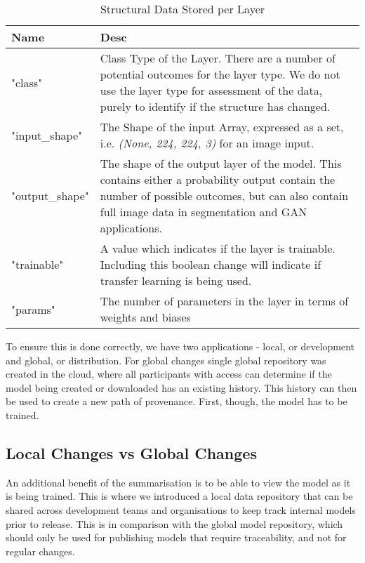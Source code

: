\begin{table}[!ht]
    \centering
    \caption{Structural Data Stored per Layer}
    \setlength\tabcolsep{0pt} %
    \begin{tabular}{@{} p{2cm} p{6.5cm}  @{}}
        \hline
        Name & Desc \\
        \hline
        "class" & Class Type of the Layer. There are a number of potential outcomes for the layer type. We do not use the layer type for assessment of the data, purely to identify if the structure has changed. \\
        "input\_shape" & The Shape of the input Array, expressed as a set, i.e. \textit{(None, 224, 224, 3)} for an image input. \\
        "output\_shape" &  The shape of the output layer of the model. This contains either a probability output contain the number of possible outcomes, but can also contain full image data in segmentation and GAN applications. \\
        "trainable" &  A value which indicates if the layer is trainable. Including this boolean change will indicate if transfer learning is being used. \\
        "params" &  The number of parameters in the layer in terms of weights and biases \\
        \hline
    \end{tabular}
\end{table}

To ensure this is done correctly, we have two applications - local, or development and global, or distribution. For global changes single global repository was created in the cloud, where all participants with access can determine if the model being created or downloaded has an existing history. This history can then be used to create a new path of provenance. First, though, the model has to be trained. 

\subsection{Local Changes vs Global Changes}

An additional benefit of the summarisation is to be able to view the model as it is being trained. This is where we introduced a local data repository that can be shared across development teams and organisations to keep track internal models prior to release. This is in comparison with the global model repository, which should only be used for publishing models that require traceability, and not for regular changes.

